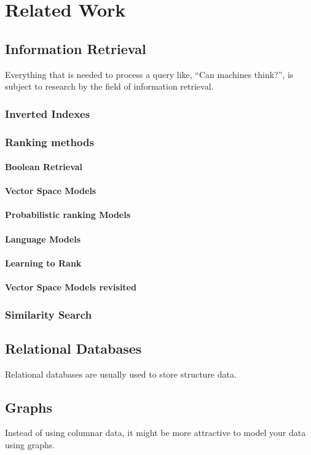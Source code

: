 \chapter{Related Work}

\section{Information Retrieval}
Everything that is needed to process a query like, ``Can machines think?'', is subject to research by the field of information retrieval. 

\subsection{Inverted Indexes}

\subsection{Ranking methods}

\subsubsection{Boolean Retrieval}
\subsubsection{Vector Space Models}
\subsubsection{Probabilistic ranking Models}
\subsubsection{Language Models}
\subsubsection{Learning to Rank}
\subsubsection{Vector Space Models revisited}

\subsection{Similarity Search}

\section{Relational Databases}
Relational databases are usually used to store structure data. 

\section{Graphs}
Instead of using columnar data, it might be more attractive to model your data using graphs. 